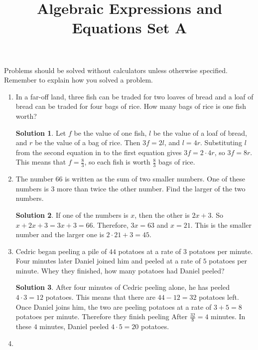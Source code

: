 \documentclass{article}
\title{Algebraic Expressions and Equations Set A}
\author{}
\date{}
\theoremstyle{definition}
\newtheorem*{solution}{Solution}
\begin{document}
    \maketitle
    \noindent Problems should be solved without calculators unless otherwise
    specified. Remember to explain how you solved a problem.
    \begin{enumerate}
        \item In a far-off land, three fish can be traded for two loaves of
        bread and a loaf of bread can be traded for four bags of rice. How many
        bags of rice is one fish worth?
        \begin{solution}
            Let $f$ be the value of one fish, $l$ be the value of a loaf of
            bread, and $r$ be the value of a bag of rice. Then $3f = 2l$, and $l
            = 4r$. Substituting $l$ from the second equation in to the first
            equation gives $3f = 2 \cdot 4r$, so $3f = 8r$. This means that $f =
            \frac{8}{3}$, so each fish is worth $\frac{8}{3}$ bags of rice.
        \end{solution}
        \item The number $66$ is written as the sum of two smaller numbers. One
        of these numbers is $3$ more than twice the other number. Find the
        larger of the two numbers.
        \begin{solution}
            If one of the numbers is $x$, then the other is $2x + 3$. So $x + 2x
            + 3 = 3x + 3 = 66$. Therefore, $3x = 63$ and $x = 21$. This is the
            smaller number and the larger one is $2 \cdot 21 + 3 = 45$.
        \end{solution}
        \item Cedric began peeling a pile of $44$ potatoes at a rate of $3$
        potatoes per minute. Four minutes later Daniel joined him and peeled at
        a rate of $5$ potatoes per minute. Whey they finished, how many potatoes
        had Daniel peeled?
        \begin{solution}
            After four minutes of Cedric peeling alone, he has peeled $4 \cdot 3
            = 12$ potatoes. This means that there are $44 - 12 = 32$ potatoes
            left. Once Daniel joins him, the two are peeling potatoes at a rate
            of $3 + 5 = 8$ potatoes per minute. Therefore they finish peeling
            After $\frac{32}{8} = 4$ minutes. In these $4$ minutes, Daniel
            peeled $4 \cdot 5 = 20$ potatoes.
        \end{solution}
        \item \begin{enumerate}

\end{enumerate}
\end{enumerate}
\end{document}
